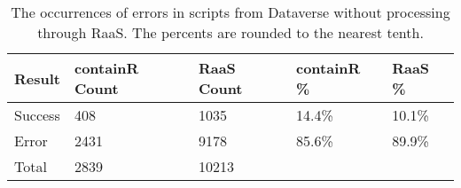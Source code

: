 \begin{table}
\centering
\caption{The occurrences of errors in scripts from Dataverse without processing through RaaS. The percents are rounded to the nearest tenth.}
\label{tab:error-occurrences}
\begin{tabular}{lllll}
\toprule
 Result & containR Count & RaaS Count & containR \% & RaaS \% \\
\midrule
Success &            408 &       1035 &      14.4\% &  10.1\% \\ \hline
  Error &           2431 &       9178 &      85.6\% &  89.9\% \\ \hline
  Total &           2839 &      10213 &            &        \\
\bottomrule
\end{tabular}
\end{table}
